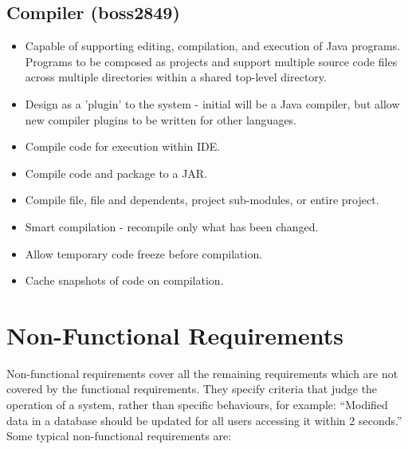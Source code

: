 \documentclass[11pt]{report}
\begin{document}
    \subsection{Compiler (boss2849)}
        \begin{itemize}
            \item Capable of supporting editing, compilation, and execution of Java programs. Programs to be composed as projects and support multiple source code files across multiple directories within a shared top-level directory.
            \item Design as a 'plugin' to the system - initial will be a Java compiler, but allow new compiler plugins to be written for other languages.
            \item Compile code for execution within IDE.
            \item Compile code and package to a JAR.
            \item Compile file, file and dependents, project sub-modules, or entire project.
            \item Smart compilation - recompile only what has been changed. 
            \item Allow temporary code freeze before compilation.
            \item Cache snapshots of code on compilation. 
        \end{itemize}
    
\section{Non-Functional Requirements}
    Non-functional requirements cover all the remaining requirements which are not covered by the functional requirements. They specify criteria that judge the operation of a system, rather than specific behaviours, for example: ``Modified data in a database should be updated for all users accessing it within 2 seconds.'' Some typical non-functional requirements are:
    
\end{document}
